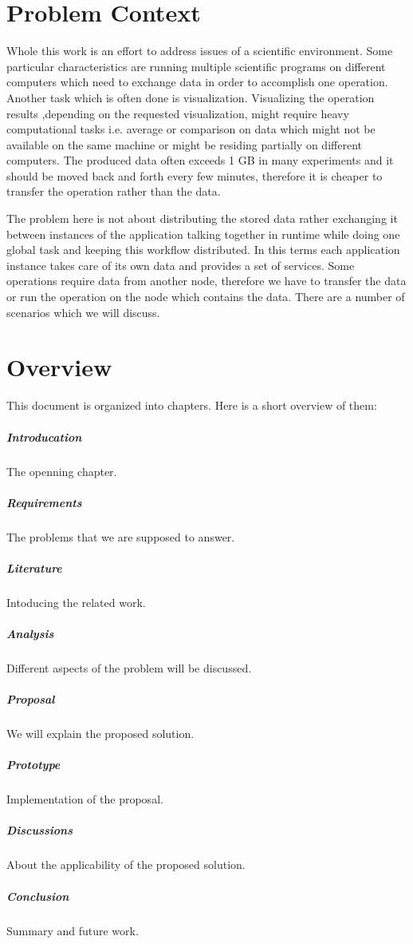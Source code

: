 \section{Problem Context}
Whole this work is an effort to address issues of a scientific environment. Some particular characteristics
are running multiple scientific programs on different computers which need to exchange data in order to
accomplish one operation. Another task which is often done is visualization. Visualizing the operation results
,depending on the requested visualization, might require heavy computational tasks i.e. average or comparison
on data which might not be available on the same machine or might be residing partially on different computers.
The produced data often exceeds 1 GB in many experiments and it should be moved back and forth every few minutes,
therefore it is cheaper to transfer the operation rather than the data.

The problem here is not about distributing the stored data rather exchanging it between instances of the application 
talking together in runtime while doing one global task and keeping this workflow distributed. In this terms each
application instance takes care of its own data and provides a set of services. Some operations require data from
another node, therefore we have to transfer the data or run the operation on the node which contains the data. There
are a number of scenarios which we will discuss.

\section{Overview}
This document is organized into  chapters. Here is a short overview of them:
\subparagraph{Introducation} The openning chapter.
\subparagraph{Requirements} The problems that we are supposed to answer.
\subparagraph{Literature} Intoducing the related work.
\subparagraph{Analysis} Different aspects of the problem will be discussed.
\subparagraph{Proposal} We will explain the proposed solution.
\subparagraph{Prototype} Implementation of the proposal.
\subparagraph{Discussions} About the applicability of the proposed solution.
\subparagraph{Conclusion} Summary and future work.
